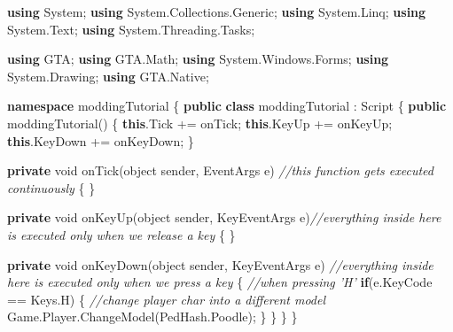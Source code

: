 \documentclass[
  openany]{book}
\newenvironment{Shaded}{\begin{snugshade}}{\end{snugshade}}
\newcommand{\CommentTok}[1]{\textcolor[rgb]{0.56,0.35,0.01}{\textit{#1}}}
\newcommand{\DataTypeTok}[1]{\textcolor[rgb]{0.13,0.29,0.53}{#1}}
\newcommand{\FunctionTok}[1]{\textcolor[rgb]{0.00,0.00,0.00}{#1}}
\newcommand{\KeywordTok}[1]{\textcolor[rgb]{0.13,0.29,0.53}{\textbf{#1}}}
\newcommand{\NormalTok}[1]{#1}
\begin{document}
\begin{Shaded}
\begin{Highlighting}[]
\KeywordTok{using}\NormalTok{ System;}
\KeywordTok{using}\NormalTok{ System.}\FunctionTok{Collections}\NormalTok{.}\FunctionTok{Generic}\NormalTok{;}
\KeywordTok{using}\NormalTok{ System.}\FunctionTok{Linq}\NormalTok{;}
\KeywordTok{using}\NormalTok{ System.}\FunctionTok{Text}\NormalTok{;}
\KeywordTok{using}\NormalTok{ System.}\FunctionTok{Threading}\NormalTok{.}\FunctionTok{Tasks}\NormalTok{;}
 
\KeywordTok{using}\NormalTok{ GTA;}
\KeywordTok{using}\NormalTok{ GTA.}\FunctionTok{Math}\NormalTok{;}
\KeywordTok{using}\NormalTok{ System.}\FunctionTok{Windows}\NormalTok{.}\FunctionTok{Forms}\NormalTok{;}
\KeywordTok{using}\NormalTok{ System.}\FunctionTok{Drawing}\NormalTok{;}
\KeywordTok{using}\NormalTok{ GTA.}\FunctionTok{Native}\NormalTok{;}
 
 
\KeywordTok{namespace}\NormalTok{ moddingTutorial}
\NormalTok{\{}
    \KeywordTok{public} \KeywordTok{class}\NormalTok{ moddingTutorial : Script}
\NormalTok{    \{}
        \KeywordTok{public} \FunctionTok{moddingTutorial}\NormalTok{()}
\NormalTok{        \{}
            \KeywordTok{this}\NormalTok{.}\FunctionTok{Tick}\NormalTok{ += onTick;}
            \KeywordTok{this}\NormalTok{.}\FunctionTok{KeyUp}\NormalTok{ += onKeyUp;}
            \KeywordTok{this}\NormalTok{.}\FunctionTok{KeyDown}\NormalTok{ += onKeyDown;}
\NormalTok{        \}}
 
        \KeywordTok{private} \DataTypeTok{void} \FunctionTok{onTick}\NormalTok{(}\DataTypeTok{object}\NormalTok{ sender, EventArgs e) }\CommentTok{//this function gets executed continuously }
\NormalTok{        \{}
\NormalTok{        \}}
 
        \KeywordTok{private} \DataTypeTok{void} \FunctionTok{onKeyUp}\NormalTok{(}\DataTypeTok{object}\NormalTok{ sender, KeyEventArgs e)}\CommentTok{//everything inside here is executed only when we release a key}
\NormalTok{        \{}
\NormalTok{        \}}
 
        \KeywordTok{private} \DataTypeTok{void} \FunctionTok{onKeyDown}\NormalTok{(}\DataTypeTok{object}\NormalTok{ sender, KeyEventArgs e) }\CommentTok{//everything inside here is executed only when we press a key}
\NormalTok{        \{}
            \CommentTok{//when pressing 'H'}
            \KeywordTok{if}\NormalTok{(e.}\FunctionTok{KeyCode}\NormalTok{ == Keys.}\FunctionTok{H}\NormalTok{)}
\NormalTok{            \{}
                \CommentTok{//change player char into a different model}
\NormalTok{                Game.}\FunctionTok{Player}\NormalTok{.}\FunctionTok{ChangeModel}\NormalTok{(PedHash.}\FunctionTok{Poodle}\NormalTok{); }
\NormalTok{            \}}
\NormalTok{        \}}
\NormalTok{    \}}
\NormalTok{\}}
\end{Highlighting}
\end{Shaded}
\end{document}
